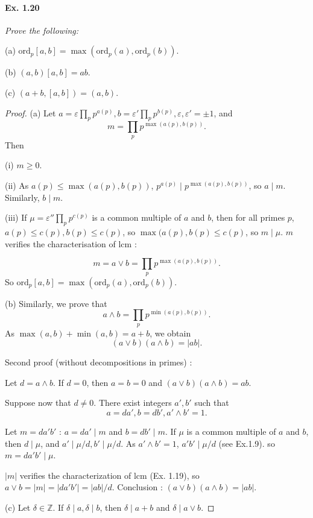 \documentclass[11pt,a4paper]{article}
\newcommand{\Z}{\mathbb{Z}}
\newcommand{\ord}{\mathrm{ord}}
\begin{document}
{\paragraph{Ex. 1.20}

{\it Prove the following:

(a) $\ord_p[a,b] = \max(\ord_p(a), \ord_p(b))$.

(b) $(a,b)[a,b] = ab$.

(c) $(a+b, [a,b] )= (a,b)$.
}

\begin{proof}
(a) Let $a = \varepsilon \prod\limits_p p^{a(p)},b =  \varepsilon'  \prod\limits_p p^{b(p)}, \varepsilon, \varepsilon' = \pm1$, and 
$$m =  \prod\limits_p p^{\max(a(p),b(p))}.$$
Then 

(i) $m \geq 0$.

(ii) As $a(p) \leq \max(a(p),b(p))$, $p^{a(p)} \mid p^{\max(a(p),b(p))}$, so $a \mid m$. Similarly, $b\mid m$.

(iii) If $\mu = \varepsilon'' \prod\limits_p p^{c(p)}$ is a common multiple of $a$ and $b$, then for all primes $p$,  $a(p) \leq c(p), b(p) \leq c(p)$, so $\max(a(p),b(p) \leq c(p)$, so $m \mid \mu$.
$m$ verifies the characterisation of lcm :

$$m = a \vee b =  \prod\limits_p p^{\max(a(p),b(p))}.$$
So $\ord_p[a,b] = \max(\ord_p(a),\ord_p(b))$.

(b) Similarly, we prove that 
$$a \wedge b = \prod\limits_p p^{\min(a(p),b(p))}.$$
As $\max(a,b) + \min(a,b) = a +b$, we obtain
$$(a \vee b)(a \wedge b) = \vert ab \vert.$$

Second proof (without decompositions in primes) :


Let $d = a \wedge b$. If $d = 0$, then $a=b= 0$ and $(a\vee b) (a \wedge b) = ab$.

Suppose now that $d \neq 0$. There exist integers $a',b'$ such that $$a = da',b = d b', a' \wedge b' = 1.$$

Let $m = da'b'$ : 
$a = da' \mid m$ and $b = db' \mid m$. If $\mu$ is a common multiple of $a$ and $b$, then $d \mid \mu$, and $a' \mid \mu/d, b' \mid \mu/d$. As $a'\wedge b' = 1$, $a'b' \mid \mu/d$ (see Ex.1.9). so $m = da'b' \mid \mu$.

$\vert m \vert$ verifies the characterization of lcm (Ex. 1.19), so $a\vee b = \vert m \vert = \vert  da'b'  \vert= \vert ab\vert /d$.
 Conclusion : $ (a\vee b)(a \wedge b) = \vert ab \vert$.
 
 (c) Let $\delta \in \Z$. If $\delta \mid a, \delta \mid b$, then $\delta \mid a+b$ and $\delta \mid a \vee b$.
 

\end{proof}}
\end{document}
